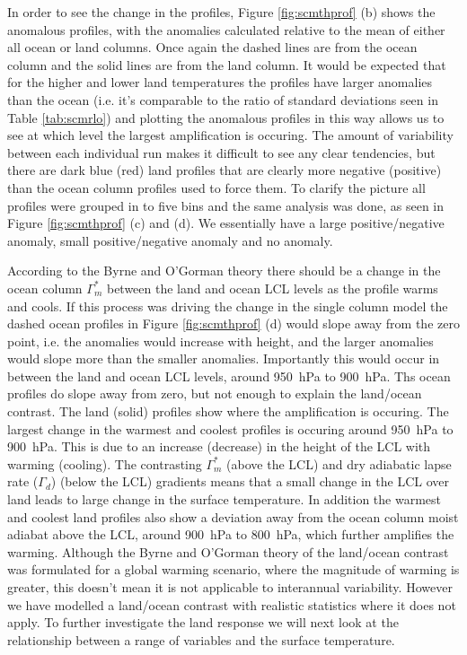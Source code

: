 In order to see the change in the profiles, Figure \ref{fig:scmthprof} (b) shows 
the anomalous profiles, with the anomalies calculated relative to the mean of 
either all ocean or land columns. Once again the dashed lines are from the ocean 
column and the solid lines are from the land column. It would be expected that 
for the higher and lower land temperatures the profiles have larger anomalies 
than the ocean (i.e. it's comparable to the ratio of standard deviations seen in 
Table \ref{tab:scmrlo}) and plotting the anomalous profiles in this way allows 
us to see at which level the largest amplification is occuring.  The amount of 
variability between each individual run makes it difficult to see any clear 
tendencies, but there are dark blue (red) land profiles that are clearly more 
negative (positive) than the ocean column profiles used to force them. To 
clarify the picture all profiles were grouped in to five bins and the same 
analysis was done, as seen in Figure \ref{fig:scmthprof} (c) and (d). We 
essentially have a large positive/negative anomaly, small positive/negative 
anomaly and no anomaly. 

According to the Byrne and O'Gorman theory there should be a change in the ocean 
column $\Gamma_m^*$ between the land and ocean LCL levels as the profile warms 
and cools. If this process was driving the change in the single column model the 
dashed ocean profiles in Figure \ref{fig:scmthprof} (d) would slope away from 
the zero point, i.e. the anomalies would increase with height, and the larger 
anomalies would slope more than the smaller anomalies. Importantly this would 
occur in between the land and ocean LCL levels, around \SI{950}{\hecto\pascal} 
to \SI{900}{\hecto\pascal}. Ths ocean profiles do slope away from zero, but not 
enough to explain the land/ocean contrast. The land (solid) profiles show where 
the amplification is occuring.  The largest change in the warmest and coolest 
profiles is occuring around \SI{950}{\hecto\pascal} to \SI{900}{\hecto\pascal}.  
This is due to an increase (decrease) in the height of the LCL with warming 
(cooling). The contrasting $\Gamma_m^*$ (above the LCL) and dry adiabatic lapse 
rate ($\Gamma_d$) (below the LCL) gradients means that a small change in the LCL 
over land leads to large change in the surface temperature. In addition the 
warmest and coolest land profiles also show a deviation away from the ocean 
column moist adiabat above the LCL, around \SI{900}{\hecto\pascal} to 
\SI{800}{\hecto\pascal}, which further amplifies the warming. Although the Byrne 
and O'Gorman theory of the land/ocean contrast was formulated for a global 
warming scenario, where the magnitude of warming is greater, this doesn't mean
it is not applicable to interannual variability. However we have modelled a 
land/ocean contrast with realistic statistics where it does not apply.
To further investigate the land response we will next look at the relationship 
between a range of variables and the surface temperature.


